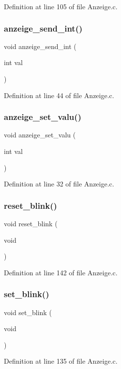 Definition at line 105 of file Anzeige.\+c.

\mbox{\label{_anzeige_8h_abd5892eb2cdbb10eb3cdb450a3753adc}} 
\subsubsection{anzeige\+\_\+send\+\_\+int()}
{\footnotesize\ttfamily void anzeige\+\_\+send\+\_\+int (\begin{DoxyParamCaption}\item[{int}]{val }\end{DoxyParamCaption})}



Definition at line 44 of file Anzeige.\+c.

\mbox{\label{_anzeige_8h_abec522a298bfc36eb7781353f177c4c4}} 
\subsubsection{anzeige\+\_\+set\+\_\+valu()}
{\footnotesize\ttfamily void anzeige\+\_\+set\+\_\+valu (\begin{DoxyParamCaption}\item[{int}]{val }\end{DoxyParamCaption})}



Definition at line 32 of file Anzeige.\+c.

\mbox{\label{_anzeige_8h_a708d9da23b8063834127863164a0f33f}} 
\subsubsection{reset\+\_\+blink()}
{\footnotesize\ttfamily void reset\+\_\+blink (\begin{DoxyParamCaption}\item[{void}]{ }\end{DoxyParamCaption})}



Definition at line 142 of file Anzeige.\+c.

\mbox{\label{_anzeige_8h_ab9f6ef1481129e65b858d36f459165e3}} 
\subsubsection{set\+\_\+blink()}
{\footnotesize\ttfamily void set\+\_\+blink (\begin{DoxyParamCaption}\item[{void}]{ }\end{DoxyParamCaption})}



Definition at line 135 of file Anzeige.\+c.

